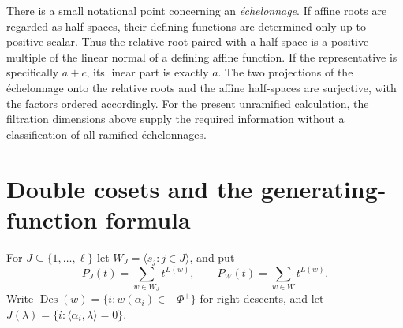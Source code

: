 \documentclass[11pt,a4paper]{article}
\theoremstyle{definition}
\newcommand{\Des}{\operatorname{Des}}
\begin{document}
There is a small notational point concerning an \emph{\'echelonnage}.
If affine roots are regarded as half-spaces, their defining functions
are determined only up to positive scalar. Thus the relative root
paired with a half-space is a positive multiple of the linear normal
of a defining affine function. If the representative is specifically
$a+c$, its linear part is exactly $a$. The two projections of the
\'echelonnage onto the relative roots and the affine half-spaces are
surjective, with the factors ordered accordingly. For the present
unramified calculation, the filtration dimensions above supply the
required information without a classification of all ramified
\'echelonnages.

\section{Double cosets and the generating-function formula}
For $J\subseteq\{1,\ldots,\ell\}$ let $W_J=\langle s_j:j\in J\rangle$,
and put
\[
 P_J(t)=\sum_{w\in W_J}t^{L(w)},\qquad P_W(t)=\sum_{w\in W}t^{L(w)}.
\]
Write $\Des(w)=\{i:w(\alpha_i)\in-\Phi^+\}$ for right descents,
and let $J(\lambda)=\{i:\langle\alpha_i,\lambda\rangle=0\}$.
\end{document}
